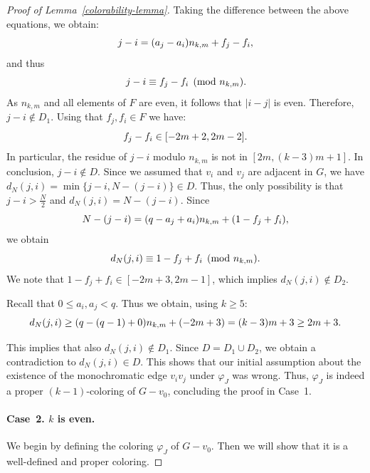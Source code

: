 \documentclass[a4paper,10pt,hidelinks]{amsart}
\renewcommand{\phi}{\ensuremath{\varphi}}
\theoremstyle{definition}
\begin{document}
\begin{proof}[Proof of Lemma~\ref{colorability-lemma}]
    Taking the difference between the above equations, we obtain:
    \begin{equation}\notag
        j - i = (a_j - a_i) n_{k, m} + f_j - f_i,
    \end{equation}
    and thus
    \begin{equation}\notag
        j - i \equiv f_j - f_i \pmod{n_{k, m}}.
    \end{equation}
    As $n_{k, m}$ and all elements of $F$ are even, it follows that $|i - j|$ is even. Therefore, $j - i \notin D_1$. Using that $f_j,f_i \in F$ we have: 
    \begin{equation}\notag
        f_j - f_i \in [-2m + 2, 2m - 2].
    \end{equation}
    In particular, the residue of $j - i$ modulo $n_{k, m}$ is not in $[2m, (k - 3)m + 1]$. In conclusion, $j - i \notin D$. Since we assumed that $v_i$ and $v_j$ are adjacent in $G$, we have $d_N(j,i)=\min\{j-i,N-(j-i)\}\in D$. Thus, the only possibility is that $j - i > \frac{N}{2}$ and $d_N(j,i)=N-(j-i)$. Since
    \begin{equation}\notag
        N - (j - i) = (q - a_j + a_i)n_{k, m} + (1 - f_j + f_i),
    \end{equation}
    we obtain
    \begin{equation}\notag
        d_N(j, i) \equiv 1 - f_j + f_i \pmod{n_{k, m}}.
    \end{equation}
    We note that $1 - f_j + f_i \in [-2m + 3, 2m - 1]$, which implies $d_N(j, i) \notin D_2$. 
    
    Recall that $0 \leq a_i, a_j < q$. Thus we obtain, using $k\ge 5$:
    \begin{equation}\notag
        d_N(j, i) \geq (q-(q-1) + 0)n_{k,m} + (-2m + 3) = (k - 3)m + 3 \geq 2m + 3.
    \end{equation}
    
    This implies that also $d_N(j,i) \notin D_1$. Since $D=D_1\cup D_2$, we obtain a contradiction to $d_N(j,i)\in D$. This shows that our initial assumption about the existence of the monochromatic edge $v_iv_j$ under $\phi_J$ was wrong. Thus, $\phi_J$ is indeed a proper $(k-1)$-coloring of $G-v_0$, concluding the proof in Case~1.

\medskip

\paragraph*{\textbf{Case~2.} $k$ is even.}

    We begin by defining the coloring $\varphi_J$ of $G - v_0$. Then we will show that it is a well-defined and proper coloring.


\end{proof}
\end{document}
